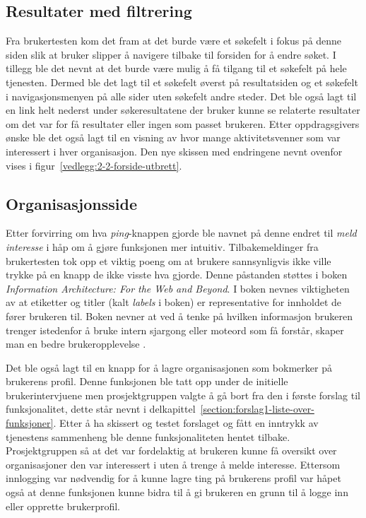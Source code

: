 \subsection{Resultater med filtrering}

Fra brukertesten kom det fram at det burde være et søkefelt i fokus på denne siden slik at bruker slipper å navigere tilbake til forsiden for å endre søket. I tillegg ble det nevnt at det burde være mulig å få tilgang til et søkefelt på hele tjenesten. Dermed ble det lagt til et søkefelt øverst på resultatsiden og et søkefelt i navigasjonsmenyen på alle sider uten søkefelt andre steder. Det ble også lagt til en link helt nederst under søkeresultatene der bruker kunne se relaterte resultater om det var for få resultater eller ingen som passet brukeren. Etter oppdragsgivers ønske ble det også lagt til en visning av hvor mange aktivitetsvenner som var interessert i hver organisasjon. Den nye skissen med endringene nevnt ovenfor vises i figur~\ref{vedlegg:2-2-forside-utbrett}.

\subsection{Organisasjonsside}

Etter forvirring om hva {\em  ping}-knappen gjorde ble navnet på denne endret til {\em  meld interesse} i håp om å gjøre funksjonen mer intuitiv. Tilbakemeldinger fra brukertesten tok opp et viktig poeng om at brukere sannsynligvis ikke ville trykke på en knapp de ikke visste hva gjorde. Denne påstanden støttes i boken {\em  Information Architecture: For the Web and Beyond}. I boken nevnes viktigheten av at etiketter og titler (kalt {\em  labels} i boken) er representative for innholdet de fører brukeren til. Boken nevner at ved å tenke på hvilken informasjon brukeren trenger istedenfor å bruke intern sjargong eller moteord som få forstår, skaper man en bedre brukeropplevelse \cite{INFARC:1}.

Det ble også lagt til en knapp for å lagre organisasjonen som bokmerker på brukerens profil. Denne funksjonen ble tatt opp under de initielle brukerintervjuene men prosjektgruppen valgte å gå bort fra den i første forslag til funksjonalitet, dette står nevnt i delkapittel~\ref{section:forslag1-liste-over-funksjoner}. Etter å ha skissert og testet forslaget og fått en inntrykk av tjenestens sammenheng ble denne funksjonaliteten hentet tilbake. Prosjektgruppen så at det var fordelaktig at brukeren kunne få oversikt over organisasjoner den var interessert i uten å trenge å melde interesse. Ettersom innlogging var nødvendig for å kunne lagre ting på brukerens profil var håpet også at denne funksjonen kunne bidra til å gi brukeren en grunn til å logge inn eller opprette brukerprofil.

